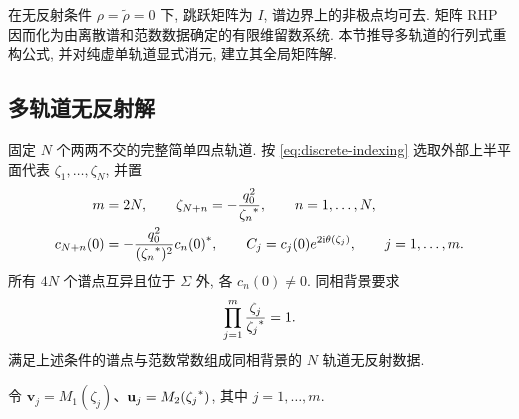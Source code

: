 在无反射条件 $\rho=\widetilde\rho=0$ 下, 跳跃矩阵为 $I$, 谱边界上的非极点均可去.
矩阵 RHP 因而化为由离散谱和范数数据确定的有限维留数系统.
本节推导多轨道的行列式重构公式, 并对纯虚单轨道显式消元, 建立其全局矩阵解.

\subsection{多轨道无反射解}
\begin{definition}\label{def:orbit-data}
固定 $N$ 个两两不交的完整简单四点轨道. 按 \eqref{eq:discrete-indexing} 选取外部上半平面代表 $\zeta_1,\ldots,\zeta_N$, 并置
\begin{equation}\label{eq:N-orbit-data}
\begin{aligned}
m&=2N,\qquad \zeta_{N+n}=-\dfrac{q_0^2}{{\zeta_n}^{*}},\qquad n=1,\ldots,N,\\
c_{N+n}(0)&=-\dfrac{q_0^2}{({\zeta_n}^{*})^2}{c_n(0)}^{*},\qquad
C_j=c_j(0)e^{2\mathrm{i}\theta(\zeta_j)},\qquad j=1,\ldots,m.
\end{aligned}
\end{equation}
所有 $4N$ 个谱点互异且位于 $\Sigma$ 外, 各 $c_n(0)\ne0$. 同相背景要求
\begin{equation}\label{eq:N-orbit-phase}
\prod\limits_{j=1}^{m}\dfrac{\zeta_j}{{\zeta_j}^{*}}=1.
\end{equation}
满足上述条件的谱点与范数常数组成同相背景的 $N$ 轨道无反射数据.
\end{definition}
令 $\mathbf v_j=M_1(\zeta_j)$、$\mathbf u_j=M_2({\zeta_j}^{*})$, 其中 $j=1,\ldots,m$.

